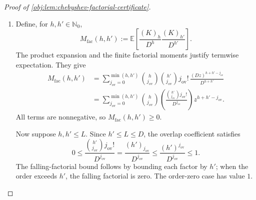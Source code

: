 \begin{proof}[Proof of \cref{obj:lem:chebyshev-factorial-certificate}]
\begin{enumerate}
Let \(h,h'\in\mathbb N_0\). First suppose \(h\le h'\). The binomial addition identity for falling-factorial polynomials, applied to \(x=(x-h)+h\), gives
\[
F_{\mathrm{fac},h'}(x)
 =\sum_{j_{\mathrm{ov}}=0}^{h'}
   \binom{h'}{j_{\mathrm{ov}}}
   F_{\mathrm{fac},j_{\mathrm{ov}}}(h)
   F_{\mathrm{fac},h'-j_{\mathrm{ov}}}(x-h).
\]
The product definition supplies
\[
F_{\mathrm{fac},h}(x)
F_{\mathrm{fac},h'-j_{\mathrm{ov}}}(x-h)
 =F_{\mathrm{fac},h+h'-j_{\mathrm{ov}}}(x).
\]
Moreover,
\[
F_{\mathrm{fac},j_{\mathrm{ov}}}(h)=0
 \quad(j_{\mathrm{ov}}>h),
\qquad
F_{\mathrm{fac},j_{\mathrm{ov}}}(h)
 =j_{\mathrm{ov}}!\binom{h}{j_{\mathrm{ov}}}
 \quad(0\le j_{\mathrm{ov}}\le h).
\]
Multiplying the addition identity by \(F_{\mathrm{fac},h}(x)\) and removing its zero terms thus gives
\[
F_{\mathrm{fac},h}(x)F_{\mathrm{fac},h'}(x)
 =\sum_{j_{\mathrm{ov}}=0}^{h}
   \binom{h}{j_{\mathrm{ov}}}
   \binom{h'}{j_{\mathrm{ov}}}
   j_{\mathrm{ov}}!\,
   F_{\mathrm{fac},h+h'-j_{\mathrm{ov}}}(x).
\]
If \(h'>h\) fails, exchange the two orders; the product and the coefficients are symmetric. Evaluating the resulting identity at any integer \(k\ge0\) yields
\[
(k)_h(k)_{h'}
 =\sum_{j_{\mathrm{ov}}=0}^{\min(h,h')}
   \binom{h}{j_{\mathrm{ov}}}
   \binom{h'}{j_{\mathrm{ov}}}
   j_{\mathrm{ov}}!\,(k)_{h+h'-j_{\mathrm{ov}}}.
\]

\item Define, for \(h,h'\in\mathbb N_0\),
\[
M_{\mathrm{fac}}(h,h')
 :=\mathbb E\!\left[
       \frac{(K)_h}{D^h}\frac{(K)_{h'}}{D^{h'}}
     \right].
\]
The product expansion and the finite factorial moments justify termwise expectation. They give
\[
\begin{aligned}
M_{\mathrm{fac}}(h,h')
 &=\sum_{j_{\mathrm{ov}}=0}^{\min(h,h')}
   \binom{h}{j_{\mathrm{ov}}}
   \binom{h'}{j_{\mathrm{ov}}}
   j_{\mathrm{ov}}!\,
   \frac{(Dz)^{h+h'-j_{\mathrm{ov}}}}{D^{h+h'}}\\
 &=\sum_{j_{\mathrm{ov}}=0}^{\min(h,h')}
   \binom{h}{j_{\mathrm{ov}}}
   \left(
     \frac{\binom{h'}{j_{\mathrm{ov}}}j_{\mathrm{ov}}!}
          {D^{j_{\mathrm{ov}}}}
   \right)
   z^{h+h'-j_{\mathrm{ov}}}.
\end{aligned}
\]
All terms are nonnegative, so \(M_{\mathrm{fac}}(h,h')\ge0\).

Now suppose \(h,h'\le L\). Since \(h'\le L\le D\), the overlap coefficient satisfies
\[
0\le
\frac{\binom{h'}{j_{\mathrm{ov}}}j_{\mathrm{ov}}!}
     {D^{j_{\mathrm{ov}}}}
 =\frac{(h')_{j_{\mathrm{ov}}}}{D^{j_{\mathrm{ov}}}}
 \le\frac{(h')^{j_{\mathrm{ov}}}}{D^{j_{\mathrm{ov}}}}
 \le1.
\]
The falling-factorial bound follows by bounding each factor by \(h'\); when the order exceeds \(h'\), the falling factorial is zero. The order-zero case has value \(1\).


\end{enumerate}
\end{proof}
